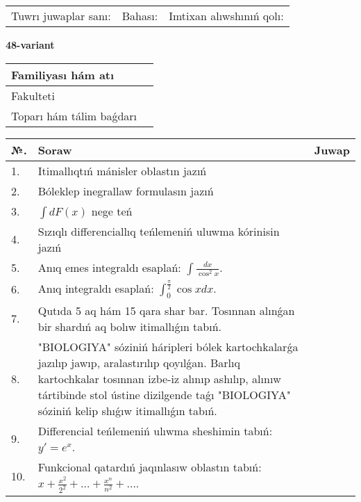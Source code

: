\documentclass{article}
\begin{document}
\vspace{1cm}

\begin{tabular}{ c c c }
Tuwrı juwaplar sanı: \underline{\hspace{2cm}} & Bahası: \underline{\hspace{2cm}} & Imtixan alıwshınıń qolı: \underline{\hspace{2cm}} \\
\end{tabular}

\newpage

\begin{center}\textbf{48-variant}\end{center}

\bgroup
\def\arraystretch{1.5}
\begin{tabular}{ |m{6cm}|m{10cm}| }
  \hline
  Familiyası hám atı & \\
  \hline
  Fakulteti &\\
  \hline
  Toparı hám tálim baǵdarı & \\
  \hline
\end{tabular}
\egroup

\vspace{0.5cm}

\bgroup
\def\arraystretch{2}
\begin{tabular}{ |l|m{8cm}|m{7cm}| }
  \hline
  №. & Soraw & Juwap \\
  \hline
  1. & Itimallıqtıń mánisler oblastın jazıń &  \\
  \hline
  2. & Bóleklep inegrallaw formulasın jazıń &  \\
  \hline
  3. & $\displaystyle\int dF(x)$ nege teń &  \\
  \hline
  4. & Sızıqlı differenciallıq teńlemeniń uluwma kórinisin jazıń &  \\
  \hline
  5. & Anıq emes integraldı esaplań: $\displaystyle\int \frac{dx}{\cos^{2}x}$. &  \\
  \hline
  6. & Anıq integraldı esaplań: $\displaystyle\int_{0}^{\frac{\pi}{2}}\cos xdx$. &  \\
  \hline
  7. & Qutıda 5 aq hám 15 qara shar bar. Tosınnan alınǵan bir shardıń aq bolıw itimallıǵın tabıń. &  \\
  \hline
  8. & "BIOLOGIYA" sóziniń háripleri bólek kartochkalarǵa jazılıp jawıp, aralastırılıp qoyılǵan. Barlıq kartochkalar tosınnan izbe-iz alınıp ashılıp, alınıw tártibinde stol ústine dizilgende taǵı "BIOLOGIYA" sóziniń kelip shıǵıw itimallıǵın tabıń. &  \\
  \hline
  9. & Differencial teńlemeniń ulıwma sheshimin tabıń: $y'=e^{x}$. &  \\
  \hline
  10. & Funkcional qatardıń jaqınlasıw oblastın tabıń: $\displaystyle x + \frac{x^{2}}{2^{2}} + \ldots + \frac{x^{n}}{n^{2}} + \ldots$. &  \\
  \hline
\end{tabular}
\egroup
\end{document}
